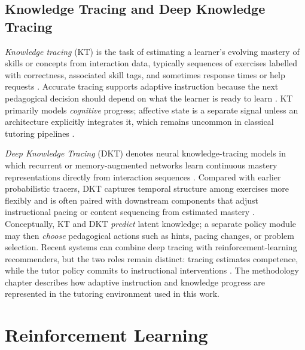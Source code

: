 \subsection{Knowledge Tracing and Deep Knowledge Tracing}\label{sec:bg:kt}

\emph{Knowledge tracing} (KT) is the task of estimating a learner's evolving mastery of skills or concepts from interaction data, typically sequences of exercises labelled with correctness, associated skill tags, and sometimes response times or help requests \cite{urbaite_adaptive_2026,kuling_ken_2025}. Accurate tracing supports adaptive instruction because the next pedagogical decision should depend on what the learner is ready to learn \cite{kuling_ken_2025,urbaite_adaptive_2026}. KT primarily models \emph{cognitive} progress; affective state is a separate signal unless an architecture explicitly integrates it, which remains uncommon in classical tutoring pipelines \cite{urbaite_adaptive_2026,axak_adaptive_nodate}.

\emph{Deep Knowledge Tracing} (DKT) denotes neural knowledge-tracing models in which recurrent or memory-augmented networks learn continuous mastery representations directly from interaction sequences \cite{urbaite_adaptive_2026,kuling_ken_2025,guzman_developing_2025}. Compared with earlier probabilistic tracers, DKT captures temporal structure among exercises more flexibly and is often paired with downstream components that adjust instructional pacing or content sequencing from estimated mastery \cite{fu_integrating_2025,guzman_developing_2025,meng_self-evolving_2025}. Conceptually, KT and DKT \emph{predict} latent knowledge; a separate policy module may then \emph{choose} pedagogical actions such as hints, pacing changes, or problem selection. Recent systems can combine deep tracing with reinforcement-learning recommenders, but the two roles remain distinct: tracing estimates competence, while the tutor policy commits to instructional interventions \cite{fu_integrating_2025,guzman_developing_2025}. The methodology chapter describes how adaptive instruction and knowledge progress are represented in the tutoring environment used in this work.

\section{Reinforcement Learning}\label{sec:bg:rl}

